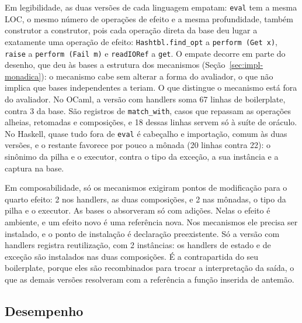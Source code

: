 \documentclass[12pt]{article}
\newcommand{\BoilerHandlers}{67}
\newcommand{\BoilerHandlersOraculo}{18}
\newcommand{\BoilerImperativa}{3}
\newcommand{\BoilerIoref}{22}
\newcommand{\BoilerMonadas}{20}
\newcommand{\PontosHandlers}{2}
\newcommand{\PontosMonadas}{2}
\newcommand{\ReusoHandlers}{2}
\begin{document}
Em legibilidade, as duas versões de cada linguagem empatam: \texttt{eval} tem
a mesma LOC, o mesmo número de operações de efeito e a mesma profundidade,
também construtor a construtor, %
pois cada operação direta da base deu lugar a exatamente uma operação de
efeito: \texttt{Hashtbl.find\_opt} a \texttt{perform (Get x)},
\texttt{raise} a \texttt{perform (Fail m)} e \texttt{readIORef} a
\texttt{get}. O empate decorre em parte do desenho, que deu às bases a
estrutura dos mecanismos (Seção~\ref{sec:impl-monadica}): o mecanismo cabe sem
alterar a forma do avaliador, o que não implica que bases independentes a teriam. O que distingue o mecanismo está fora do avaliador. No OCaml, a
versão com handlers soma \BoilerHandlers{} linhas de
boilerplate, contra \BoilerImperativa{} da base. %
São registros de \texttt{match\_with}, casos que repassam as operações
alheias, retomadas e composições, e \BoilerHandlersOraculo{} dessas linhas
servem só à suíte de oráculo. No Haskell, quase tudo fora de \texttt{eval} é cabeçalho e
importação, comum às duas versões, e o restante favorece por pouco a mônada
(\BoilerMonadas{} linhas contra \BoilerIoref{}): o sinônimo da pilha e o
executor, contra o tipo da exceção, a sua instância e a captura na
base. %

Em composabilidade, só os mecanismos exigiram pontos de modificação para o
quarto efeito: \PontosHandlers{} nos handlers, as duas composições, e
\PontosMonadas{} nas mônadas, o tipo da pilha e o executor. As bases o
absorveram só com adições. %
Nelas o efeito é ambiente, e um efeito novo é uma referência nova. Nos
mecanismos ele precisa ser instalado, e o ponto de instalação é declaração
preexistente. Só a versão com handlers registra reutilização, com
\ReusoHandlers{} instâncias: os handlers de estado e de exceção são
instalados nas duas composições. %
É a contrapartida do seu boilerplate, porque eles são recombinados
para trocar a interpretação da saída, o que as demais versões resolveram com a
referência a função inserida de antemão.

\subsection{Desempenho}\label{sec:medicao}
\end{document}
